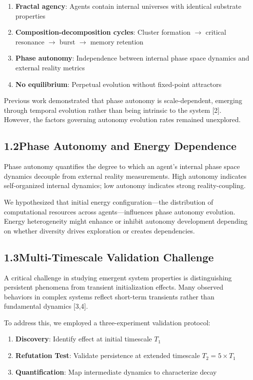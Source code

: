 \documentclass[11pt]{article}
\begin{document}
\begin{enumerate}
    \item \textbf{Fractal agency}: Agents contain internal universes with identical substrate properties
    \item \textbf{Composition-decomposition cycles}: Cluster formation $\rightarrow$ critical resonance $\rightarrow$ burst $\rightarrow$ memory retention
    \item \textbf{Phase autonomy}: Independence between internal phase space dynamics and external reality metrics
    \item \textbf{No equilibrium}: Perpetual evolution without fixed-point attractors
\end{enumerate}

Previous work demonstrated that phase autonomy is scale-dependent, emerging through temporal evolution rather than being intrinsic to the system [2]. However, the factors governing autonomy evolution rates remained unexplored.

\subsection*{1.2\quad Phase Autonomy and Energy Dependence}

Phase autonomy quantifies the degree to which an agent's internal phase space dynamics decouple from external reality measurements. High autonomy indicates self-organized internal dynamics; low autonomy indicates strong reality-coupling.

We hypothesized that initial energy configuration---the distribution of computational resources across agents---influences phase autonomy evolution. Energy heterogeneity might enhance or inhibit autonomy development depending on whether diversity drives exploration or creates dependencies.

\subsection*{1.3\quad Multi-Timescale Validation Challenge}

A critical challenge in studying emergent system properties is distinguishing persistent phenomena from transient initialization effects. Many observed behaviors in complex systems reflect short-term transients rather than fundamental dynamics [3,4].

To address this, we employed a three-experiment validation protocol:
\begin{enumerate}
    \item \textbf{Discovery}: Identify effect at initial timescale $T_1$
    \item \textbf{Refutation Test}: Validate persistence at extended timescale $T_2 = 5 \times T_1$
    \item \textbf{Quantification}: Map intermediate dynamics to characterize decay
\end{enumerate}
\end{document}
